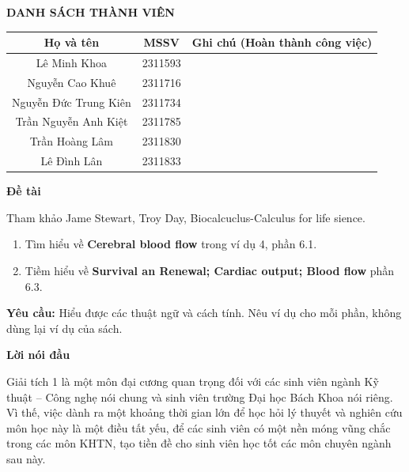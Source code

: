 \documentclass[12pt,a4paper]{article}
\begin{document}
\newpage
{}
\begin{center}
	\textbf{\uppercase{Danh sách thành viên}}
\end{center}
\begin{table}[H]
	\centering
	\def\arraystretch{2.5}
	\begin{tabular}{|c|c|c|}
		\hline
		\textbf{Họ và tên}    & \textbf{MSSV} & \textbf{Ghi chú \newline(Hoàn thành công việc)} \\
		\hline
		Lê Minh Khoa          & 2311593       &                                                 \\
		\hline
		Nguyễn Cao Khuê       & 2311716       &                                                 \\
		\hline
		Nguyễn Đức Trung Kiên & 2311734       &                                                 \\
		\hline
		Trần Nguyễn Anh Kiệt  & 2311785       &                                                 \\
		\hline
		Trần Hoàng Lâm        & 2311830       &                                                 \\
		\hline
		Lê Đình Lân           & 2311833       &                                                 \\
		\hline
	\end{tabular}
\end{table}

\newpage
\begin{center}
	\large\textbf{Đề tài}
\end{center}

Tham khảo Jame Stewart, Troy Day, Biocalcuclus-Calculus for life sience.
\begin{enumerate} [1.]
	\item Tìm hiểu về \textbf{Cerebral blood flow} trong ví dụ 4, phần 6.1.
	\item Tiềm hiểu về \textbf{Survival an Renewal; Cardiac output; Blood flow} phần 6.3.
\end{enumerate}

\textbf{Yêu cầu:} Hiểu được các thuật ngữ và cách tính. Nêu ví dụ cho mỗi phần, không dùng lại ví dụ của sách.

\newpage
\begin{center}
	\large\textbf{Lời nói đầu}
\end{center}

Giải tích 1 là một môn đại cương quan trọng đối với các sinh viên ngành Kỹ thuật – Công nghẹ nói chung và sinh viên trường Đại học Bách Khoa nói riêng. Vì thế, việc dành ra một khoảng thời gian lớn để học hỏi lý thuyết và nghiên cứu môn học này là một điều tất yếu, để các sinh viên có một nền móng vũng chắc trong các môn KHTN, tạo tiền đề cho sinh viên học tốt các môn chuyên ngành sau này.\newline
\end{document}
